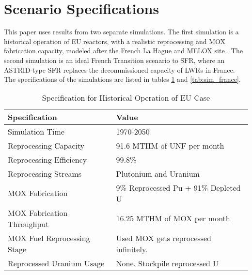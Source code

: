 \section{Scenario Specifications}
This paper uses results from two separate simulations.
The first simulation is a historical operation of \gls{EU} reactors, with a
realistic reprocessing and \gls{MOX} fabrication capacity, 
modeled after the French La Hague and MELOX site \cite{schneider_spent_2008, hugelmann_melox_1999}.
The second simulation is an ideal French Transition scenario to \gls{SFR},
where an ASTRID-type \gls{SFR} replaces the decommissioned
capacity of \glspl{LWR} in France. The specifications of the simulations
are listed in tables \ref{tab:sim_eu} and \ref{tab:sim_france}.

\begin{table}[h]
	\centering
	\begin{tabularx}{\textwidth}{bb}
		\hline
		Specification & Value \\
		\hline
		Simulation Time & 1970-2050 \\ 
		Reprocessing Capacity & 91.6 MTHM of \gls{UNF} per month \cite{schneider_spent_2008} \\
		Reprocessing Efficiency & 99.8\% \\
		Reprocessing Streams & Plutonium and Uranium \\
		\gls{MOX} Fabrication & \small{9\% Reprocessed Pu + 91\% Depleted U} \\
		\gls{MOX} Fabrication Throughput & 16.25 MTHM of \gls{MOX} per month  \cite{hugelmann_melox_1999} \\
		\gls{MOX} Fuel Reprocessing Stage &  Used \gls{MOX} gets reprocessed infinitely. \\  
		Reprocessed Uranium Usage &  None. Stockpile reprocessed U \\
		\hline
	\end{tabularx}
	\caption {Specification for Historical Operation of \gls{EU} Case}
	\label{tab:sim_eu}
\end{table}

